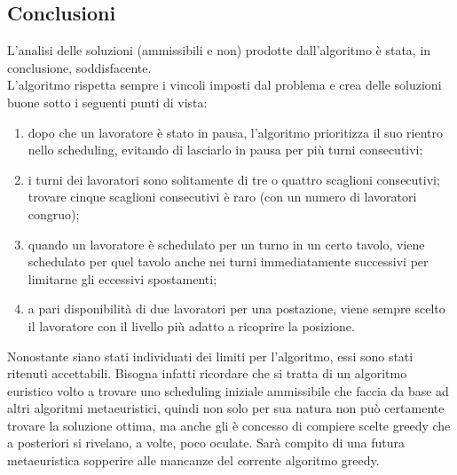 \subsection{Conclusioni}
L'analisi delle soluzioni (ammissibili e non) prodotte dall'algoritmo è stata, in conclusione, soddisfacente. \\
L'algoritmo rispetta sempre i vincoli imposti dal problema e crea delle soluzioni buone sotto i seguenti punti di vista:
\begin{enumerate}
    \item dopo che un lavoratore è stato in pausa, l'algoritmo prioritizza il suo rientro nello scheduling, evitando di lasciarlo in pausa per più turni consecutivi;
    \item i turni dei lavoratori sono solitamente di tre o quattro scaglioni consecutivi; trovare cinque scaglioni consecutivi è raro (con un numero di lavoratori congruo);
    \item quando un lavoratore è schedulato per un turno in un certo tavolo, viene schedulato per quel tavolo anche nei turni immediatamente successivi per limitarne gli eccessivi spostamenti;
    \item a pari disponibilità di due lavoratori per una postazione, viene sempre scelto il lavoratore con il livello più adatto a ricoprire la posizione.
\end{enumerate}
Nonostante siano stati individuati dei limiti per l'algoritmo, essi sono stati ritenuti accettabili. Bisogna infatti ricordare che si tratta di un algoritmo euristico volto a trovare uno scheduling iniziale ammissibile che faccia da base ad altri algoritmi metaeuristici, quindi non solo per sua natura non può certamente trovare la soluzione ottima, ma anche gli è concesso di compiere scelte greedy che a posteriori si rivelano, a volte, poco oculate. Sarà compito di una futura metaeuristica sopperire alle mancanze del corrente algoritmo greedy.